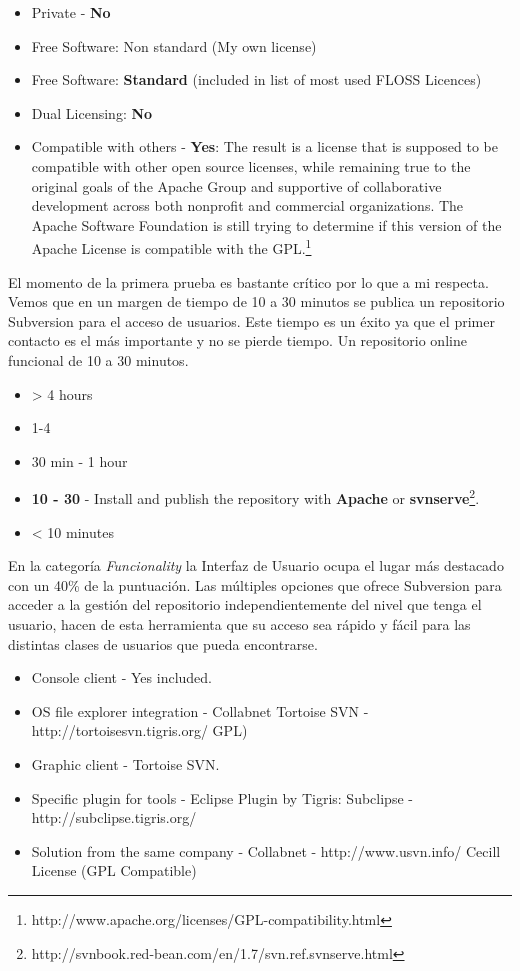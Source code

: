 \documentclass[11pt]{scrartcl}
\begin{document}
\begin{itemize} 
    \item Private - \textbf{No}
    \item Free Software: Non standard (My own license)
    \item Free Software: \textbf{Standard} (included in list of most used FLOSS Licences)
    \item Dual Licensing: \textbf{No}
    \item Compatible with others - \textbf{Yes}: The result is a license that is supposed to be compatible with other open source licenses, while remaining true to the original goals of the Apache Group and supportive of collaborative development across both nonprofit and commercial organizations. The Apache Software Foundation is still trying to determine if this version of the Apache License is compatible with the GPL.\footnote{http://www.apache.org/licenses/GPL-compatibility.html}    
\end{itemize}

\par El momento de la primera prueba es bastante cr\'itico por lo que a mi respecta. Vemos que en un margen de tiempo de 10 a 30 minutos se publica un repositorio Subversion para el acceso de usuarios. Este tiempo es un \'exito ya que el primer contacto es el m\'as importante y no se pierde tiempo. Un repositorio online funcional de 10 a 30 minutos.

\begin{itemize}
    \item \textgreater
4 hours
    \item 1-4 
    \item 30 min - 1 hour
    \item \textbf{10 - 30} - Install and publish the repository with \textbf{Apache} or \textbf{svnserve}\footnote{http://svnbook.red-bean.com/en/1.7/svn.ref.svnserve.html}.
    \item \textless
10 minutes
\end{itemize}

\par En la categor\'ia \emph{Funcionality} la Interfaz de Usuario ocupa el lugar m\'as destacado con un 40\% de la puntuaci\'on. Las m\'ultiples opciones que ofrece Subversion para acceder a la gesti\'on del repositorio independientemente del nivel que tenga el usuario, hacen de esta herramienta que su acceso sea r\'apido y f\'acil para las distintas clases de usuarios que pueda encontrarse.

\begin{itemize}
    \item Console client - Yes included.
    \item OS file explorer integration - Collabnet Tortoise SVN - http://tortoisesvn.tigris.org/ GPL)
    \item Graphic client - Tortoise SVN.
    \item Specific plugin for tools - Eclipse Plugin by Tigris: Subclipse - http://subclipse.tigris.org/
    \item Solution from the same company - Collabnet - http://www.usvn.info/ Cecill License (GPL Compatible)
\end{itemize}
\end{document}
